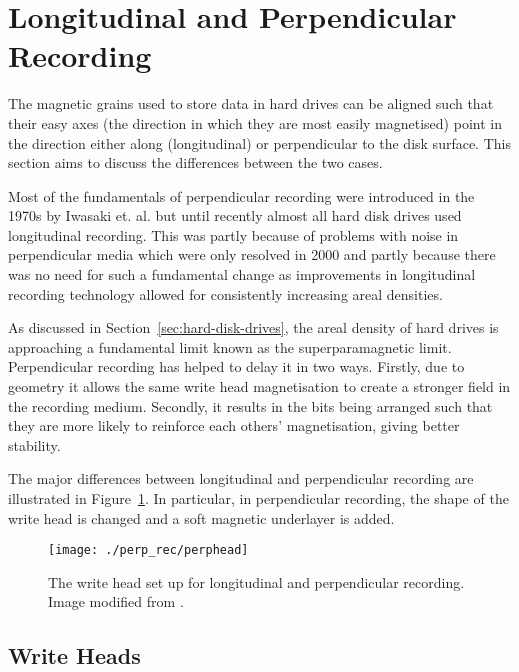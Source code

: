 \section{Longitudinal and Perpendicular Recording}
\label{sec:long-perp-record}

The magnetic grains used to store data in hard drives can be aligned such that
their easy axes (the direction in which they are most easily magnetised) point
in the direction either along (longitudinal) or perpendicular to the disk
surface. This section aims to discuss the differences between the two cases.

Most of the fundamentals of perpendicular recording were introduced in the 1970s
by Iwasaki et. al.\cite{Piramanayagam2009a} but until recently almost all hard
disk drives used longitudinal recording.  This was partly because of problems
with noise in perpendicular media which were only resolved in
2000\cite{Piramanayagam2009a} and partly because there was no need for such a
fundamental change as improvements in longitudinal recording technology allowed
for consistently increasing areal densities.

As discussed in Section~\ref{sec:hard-disk-drives}, the areal density of hard
drives is approaching a fundamental limit known as the superparamagnetic
limit. Perpendicular recording has helped to delay it in two ways. Firstly, due
to geometry it allows the same write head magnetisation to create a stronger
field in the recording medium. Secondly, it results in the bits being arranged
such that they are more likely to reinforce each others' magnetisation, giving
better stability.

The major differences between longitudinal and perpendicular recording are
illustrated in Figure~\ref{fig:Longitudinal-perpendicular}. In particular, in
perpendicular recording, the shape of the write head is changed and a soft magnetic
underlayer is added.

\begin{figure}[!ht]
  \center
  \texttt{[image: ./perp\_rec/perphead]}
  \caption{The write head set up for longitudinal and perpendicular recording.
    Image modified from
    \cite{LongitudinalPerpDiagram}.}
  \label{fig:Longitudinal-perpendicular}
\end{figure}

\subsection{Write Heads}


